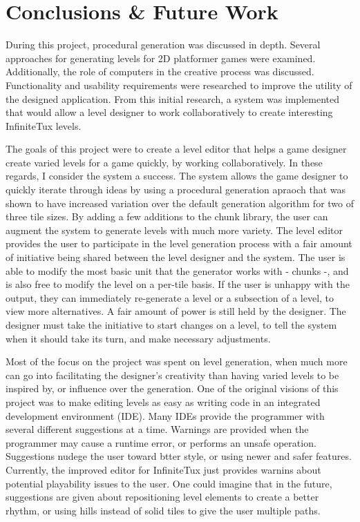 \chapter{Conclusions \& Future Work}

During this project, procedural generation was discussed in depth. Several approaches for
generating levels for 2D platformer games were examined. Additionally, the role of computers
in the creative process was discussed. Functionality and usability requirements were
researched to improve the utility of the designed application. From this initial research,
a system was implemented that would allow a level designer to work collaboratively to create
interesting InfiniteTux levels.

The goals of this project were to create a level editor that helps a game designer create
varied levels for a game quickly, by working collaboratively. In these regards, I consider
the system a success. The system allows the game designer to quickly iterate through
ideas by using a procedural generation apraoch that was shown to have increased variation
over the default generation algorithm for two of three tile sizes. By adding a few additions
to the chunk library, the user can augment the system to generate levels with much more
variety. The level editor provides the user to participate in the level generation process
with a fair amount of initiative being shared between the level designer and the system.
The user is able to modify the most basic unit that the generator works with - chunks -, and
is also free to modify the level on a per-tile basis. If the user is unhappy with the output,
they can immediately re-generate a level or a subsection of a level, to view more 
alternatives. A fair amount of power is still held by the designer. The designer must take
the initiative to start changes on a level, to tell the system when it should take its turn,
and make necessary adjustments. 

Most of the focus on the project was spent on level generation, when much more can go into
facilitating the designer's creativity than having varied levels to be inspired by, or
influence over the generation. One of the original visions of this project was to make
editing levels as easy as writing code in an integrated development environment (IDE). Many
IDEs provide the programmer with several different suggestions at a time. Warnings are
provided when the programmer may cause a runtime error, or performs an unsafe operation. 
Suggestions nudege the user toward btter style, or using newer and safer features.
Currently, the improved editor for InfiniteTux just provides warnins about potential
playability issues to the user. One could imagine that in the future, suggestions are given
about repositioning level elements to create a better rhythm, or using hills instead of
solid tiles to give the user multiple paths.

